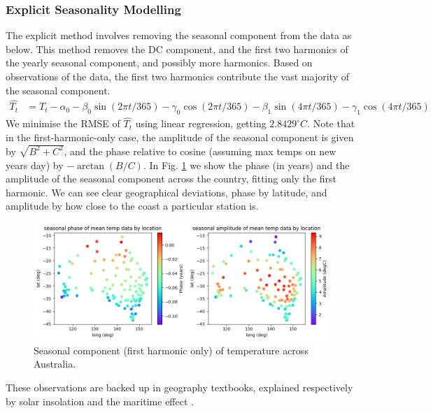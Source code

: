 \documentclass[12pt,a4paper]{article} %
\begin{document}
\subsubsection{Explicit Seasonality Modelling}
\label{subsec:seasonality}
The explicit method involves removing the seasonal component from the data as below. This method removes the DC component, and the first two harmonics of the yearly seasonal component, and possibly more harmonics. Based on observations of the data, the first two harmonics contribute the vast majority of the seasonal component.
\begin{align*}
    \hat{T_t}&=T_t-\alpha_0-\beta_0\sin(2\pi t/365)-\gamma_0\cos(2\pi t/365)-\beta_1\sin(4\pi t/365)-\gamma_1\cos(4\pi t/365)
\end{align*}
We minimise the RMSE of $\hat{T_t}$ using linear regression, getting $2.8429^\circ C$. Note that in the first-harmonic-only case, the amplitude of the seasonal component is given by $\sqrt{B^2+C^2}$, and the phase relative to cosine (assuming max temps on new years day) by $-\arctan(B/C)$. In Fig. \ref{fig:sin_adj} we show the phase (in years) and the amplitude of the seasonal component across the country, fitting only the first harmonic. We can see clear geographical deviations, phase by latitude, and amplitude by how close to the coast a particular station is.
\begin{figure}[!ht]
    \centering
    \includegraphics[width=\linewidth]{mean_params_by_loc.png}
    \caption{Seasonal component (first harmonic only) of temperature across Australia.}
    \label{fig:sin_adj}
\end{figure}
These observations are backed up in geography textbooks, explained respectively by solar insolation and the maritime effect \cite{roger}.\\
\end{document}
